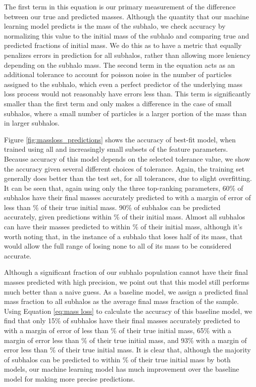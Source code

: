 \documentclass[fleqn,usenatbib]{mnras}
\begin{document}
The first term in this equation is our primary measurement of the difference between our true and predicted masses. Although the quantity that our machine learning model predicts is the mass of the subhalo, we check accuracy by normalizing this value to the initial mass of the subhalo and comparing true and predicted fractions of initial mass. We do this as to have a metric that equally penalizes errors in prediction for all subhalos, rather than allowing more leniency depending on the subhalo mass. The second term in the equation acts as an additional tolerance to account for poisson noise in the number of particles assigned to the subhalo, which even a perfect predictor of the underlying mass loss process would not reasonably have errors less than. This term is significantly smaller than the first term and only makes a difference in the case of small subhalos, where a small number of particles is a larger portion of the mass than in larger subhalos.

Figure \ref{fig:massloss_predictions} shows the accuracy of best-fit model, when trained using all and increasingly small subsets of the feature parameters. Because accuracy of this model depends on the selected tolerance value, we show the accuracy given several different choices of tolerance. Again, the training set generally does better than the test set, for all tolerances, due to slight  overfitting. It can be seen that, again using only the three top-ranking parameters, 60\% of subhalos have their final masses accurately predicted to with a margin of error of less than \% of their true initial mass. 90\% of subhalos can be predicted accurately, given predictions within \% of their initial mass. Almost all subhalos can have their masses predicted to within \% of their initial mass, although it's worth noting that, in the instance of a subhalo that loses half of its mass, that would allow the full range of losing none to all of its mass to be considered accurate. 

Although a significant fraction of our subhalo population cannot have their final masses predicted with high precision, we point out that this model still performs much better than a naive guess. As a baseline model, we assign a predicted final mass fraction to all subhalos as the average final mass fraction of the sample. Using Equation \ref{eq:mass loss} to calculate the accuracy of this baseline model, we find that only 15\% of subhalos have their final masses accurately predicted to with a margin of error of less than \% of their true initial mass, 65\% with a margin of error less than \% of their true initial mass, and 93\% with a margin of error less than \% of their true initial mass. It is clear that, although the majority of subhalos can be predicted to within \% of their true initial mass by both models, our machine learning model has much improvement over the baseline model for making more precise predictions.
\end{document}
